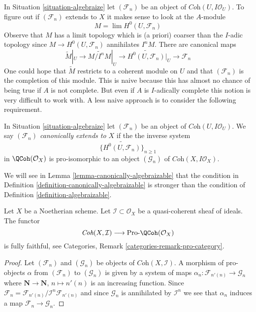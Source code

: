 \noindent
In Situation \ref{situation-algebraize} let $(\mathcal{F}_n)$ be an
object of $\textit{Coh}(U, I\mathcal{O}_U)$. To figure out if
$(\mathcal{F}_n)$ extends to $X$ it makes sense to look at the $A$-module
\begin{equation}
\label{equation-guess}
M = \lim H^0(U, \mathcal{F}_n)
\end{equation}
Observe that $M$ has a limit topology which is (a priori) coarser than
the $I$-adic topology since $M \to H^0(U, \mathcal{F}_n)$ annihilates $I^nM$.
There are canonical maps
$$
\widetilde{M}|_U \to \widetilde{M/I^nM}|_U \to
\widetilde{H^0(U, \mathcal{F}_n)}|_U \to
\mathcal{F}_n
$$
One could hope that $\widetilde{M}$ restricts to a coherent module
on $U$ and that $(\mathcal{F}_n)$ is the completion of this module.
This is naive because this has almost no chance of being true
if $A$ is not complete. But even if $A$ is $I$-adically complete
this notion is very difficult to work with.
A less naive approach is to consider the following requirement.

\begin{definition}
\label{definition-canonically-algebraizable}
In Situation \ref{situation-algebraize} let $(\mathcal{F}_n)$ be an
object of $\textit{Coh}(U, I\mathcal{O}_U)$. We say
{\it $(\mathcal{F}_n)$ canonically extends to $X$} if the the
inverse system
$$
\{\widetilde{H^0(U, \mathcal{F}_n)}\}_{n \geq 1}
$$
in $\QCoh(\mathcal{O}_X)$ is pro-isomorphic to an object
$(\mathcal{G}_n)$ of $\textit{Coh}(X, I\mathcal{O}_X)$.
\end{definition}

\noindent
We will see in Lemma \ref{lemma-canonically-algebraizable}
that the condition in Definition \ref{definition-canonically-algebraizable}
is stronger than the condition of Definition \ref{definition-algebraizable}.

\begin{lemma}
\label{lemma-recognize-formal-coherent-modules}
Let $X$ be a Noetherian scheme. Let $\mathcal{I} \subset \mathcal{O}_X$
be a quasi-coherent sheaf of ideals. The functor
$$
\textit{Coh}(X, \mathcal{I}) \longrightarrow \text{Pro-}\QCoh(\mathcal{O}_X)
$$
is fully faithful, see Categories, Remark \ref{categories-remark-pro-category}.
\end{lemma}

\begin{proof}
Let $(\mathcal{F}_n)$ and $(\mathcal{G}_n)$ be objects of
$\textit{Coh}(X, \mathcal{I})$. A morphism of pro-objects
$\alpha$ from $(\mathcal{F}_n)$ to $(\mathcal{G}_n)$ is given
by a system of maps
$\alpha_n : \mathcal{F}_{n'(n)} \to \mathcal{G}_n$
where $\mathbf{N} \to \mathbf{N}$, $n \mapsto n'(n)$
is an increasing function. Since
$\mathcal{F}_n = \mathcal{F}_{n'(n)}/\mathcal{I}^n\mathcal{F}_{n'(n)}$
and since $\mathcal{G}_n$ is annihilated by $\mathcal{I}^n$
we see that $\alpha_n$ induces a map $\mathcal{F}_n \to \mathcal{G}_n$.
\end{proof}

